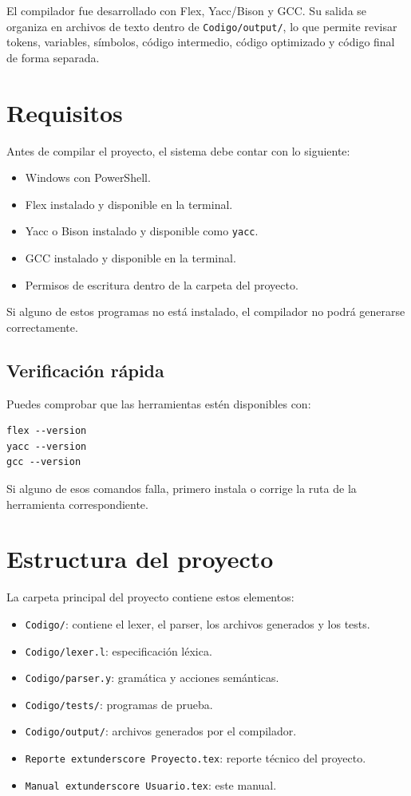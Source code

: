 \documentclass[12pt]{article}
\begin{document}
El compilador fue desarrollado con Flex, Yacc/Bison y GCC. Su salida se organiza en archivos de texto dentro de \texttt{Codigo/output/}, lo que permite revisar tokens, variables, símbolos, código intermedio, código optimizado y código final de forma separada.

\section{Requisitos}
Antes de compilar el proyecto, el sistema debe contar con lo siguiente:
\begin{itemize}[label={-}]
    \item Windows con PowerShell.
    \item Flex instalado y disponible en la terminal.
    \item Yacc o Bison instalado y disponible como \texttt{yacc}.
    \item GCC instalado y disponible en la terminal.
    \item Permisos de escritura dentro de la carpeta del proyecto.
\end{itemize}

Si alguno de estos programas no está instalado, el compilador no podrá generarse correctamente.

\subsection{Verificación rápida}
Puedes comprobar que las herramientas estén disponibles con:
\begin{lstlisting}[language={}, caption={Verificación de herramientas}]
flex --version
yacc --version
gcc --version
\end{lstlisting}

Si alguno de esos comandos falla, primero instala o corrige la ruta de la herramienta correspondiente.

\section{Estructura del proyecto}
La carpeta principal del proyecto contiene estos elementos:
\begin{itemize}[label={-}]
    \item \texttt{Codigo/}: contiene el lexer, el parser, los archivos generados y los tests.
    \item \texttt{Codigo/lexer.l}: especificación léxica.
    \item \texttt{Codigo/parser.y}: gramática y acciones semánticas.
    \item \texttt{Codigo/tests/}: programas de prueba.
    \item \texttt{Codigo/output/}: archivos generados por el compilador.
    \item \texttt{Reporte	extunderscore Proyecto.tex}: reporte técnico del proyecto.
    \item \texttt{Manual	extunderscore Usuario.tex}: este manual.
\end{itemize}
\end{document}

